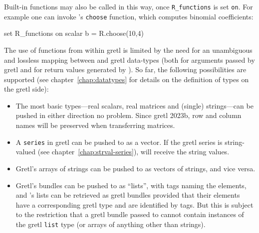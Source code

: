 Built-in  functions may also be called in this way, once
\verb|R_functions| is set \texttt{on}.  For example one can invoke
's \texttt{choose} function, which computes binomial
coefficients:
%
\begin{code}
set R_functions on
scalar b = R.choose(10,4)
\end{code}

The use of  functions from within gretl is limited by the need
for an unambiguous and lossless mapping between  and gretl
data-types (both for arguments passed by gretl and for return values
generated by ). So far, the following possibilities are
supported (see chapter~\ref{chap:datatypes} for details on the
definition of types on the gretl side):
\begin{itemize}
\item The most basic types---real scalars, real matrices and (single)
  strings---can be pushed in either direction no problem. Since gretl
  2023b, row and column names will be preserved when transferring
  matrices.
\item A \texttt{series} in gretl can be pushed to  as a
  vector. If the gretl series is string-valued (see
  chapter~\ref{chap:strval-series}),  will receive the string
  values.
\item Gretl's arrays of strings can be pushed to  as vectors of
  strings, and vice versa.
\item Gretl's bundles can be pushed to  as ``lists'', with tags
  naming the elements, and 's lists can be retrieved as gretl
  bundles provided that their elements have a corresponding gretl type
  and are identified by tags. But this is subject to the restriction
  that a gretl bundle passed to  cannot contain instances of
  the gretl \texttt{list} type (or arrays of anything other than
  strings).
\end{itemize}


